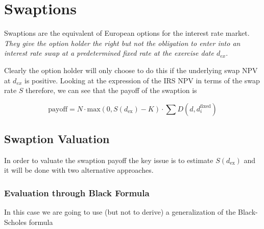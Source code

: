 \section{Swaptions}
\label{interest-rate-swaptions}

Swaptions are the equivalent of European options for the interest rate market. \emph{They give the option holder the right but not the obligation to enter into an interest rate swap at a predetermined fixed rate at the exercise date $d_{ex}$}.

Clearly the option holder will only choose to do this if the underlying swap NPV at $d_{ex}$ is positive. Looking at the expression of the IRS NPV in terms of the swap rate $S$ therefore, we can see that the payoff of the swaption is

\begin{equation}
\mathrm{payoff} = N\cdot \mathrm{max}(0, S(d_{\mathrm{ex}}) - K)\cdot\sum D(d, d_i^{\mathrm{fixed}})
\label{eq:swaption_payoff}
\end{equation}



\subsection{Swaption Valuation}

In order to valuate the swaption payoff the key issue is to estimate $S(d_{\mathrm{ex}})$ and it will be done with two alternative approaches.

\subsubsection{Evaluation through Black Formula}
\label{evaluation-through-black-scholes-formula}

In this case we are going to use (but not to derive) a generalization of the Black-Scholes formula

